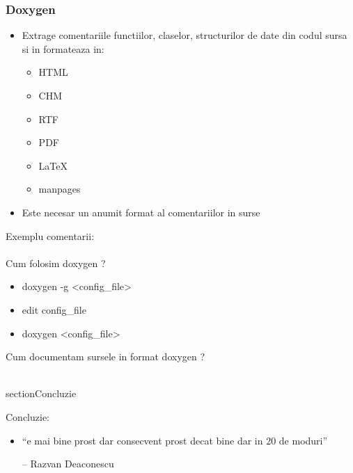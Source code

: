 \documentclass{beamer}
\begin{document}
  \begin{frame}[allowframebreaks]
  \frametitle{Doxygen}
  \begin{itemize}
  \item Extrage comentariile functiilor, claselor, structurilor de date din codul sursa si in formateaza in:\\ \begin{itemize} \item HTML \item CHM \item RTF \item PDF \item LaTeX \item manpages \end{itemize}
  \item Este necesar un anumit format al comentariilor in surse
  \end{itemize}
  \framebreak
  Exemplu comentarii:\\ 
  \framebreak
  \\ Cum folosim doxygen ? \\
  \begin{itemize}
  \item {\ttfamily doxygen -g <config\_file>}
  \item edit config\_file
  \item {\ttfamily doxygen <config\_file>} 
  \end{itemize}
  \framebreak
  Cum documentam sursele in format doxygen ? \\ 
  \vspace{0.5cm} 
   \\
  \framebreak
  
  \end{frame}

 section{Concluzie}
  
  \frame{\tableofcontents[currentsection]}
  
  \begin{frame}{Concluzie:}
  \begin{itemize}
  \item ``e mai bine prost dar consecvent prost decat bine dar in 20 de moduri''\\ \begin{flushright}-- Razvan Deaconescu \end{flushright}
  \end{itemize}
  \end{frame}
\end{document}
